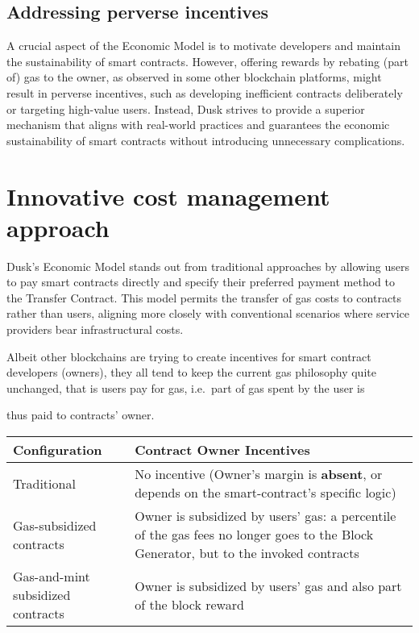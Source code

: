 \documentclass[twocolumn, nofootinbib]{revtex4-2} %
\begin{document}
    \subsection{Addressing perverse incentives}\label{sec:motivations:addressing-perverse-incentives}
    A crucial aspect of the Economic Model is to motivate developers and
    maintain the sustainability of smart contracts.
    However, offering rewards by rebating (part of) gas to the owner, as
    observed in some other blockchain platforms, might result in perverse
    incentives, such as developing inefficient contracts deliberately or
    targeting high-value users.
    Instead, Dusk strives to provide a superior mechanism that aligns with
    real-world practices and guarantees the economic sustainability of smart
    contracts without introducing unnecessary complications.

    \section{Innovative cost management approach}\label{sec:innovative-cost-management-approach}
    Dusk's Economic Model stands out from traditional approaches by allowing
    users to pay smart contracts directly and specify their preferred payment
    method to the Transfer Contract.
    This model permits the transfer of gas costs to contracts rather than users,
    aligning more closely with conventional scenarios where service providers
    bear infrastructural costs.

    Albeit other blockchains are trying to create incentives for smart contract
    developers (owners), they all tend to keep the current gas philosophy quite
    unchanged, that is users pay for gas, i.e.\ part of gas spent by the user is

    thus paid to contracts' owner.

    \begin{tabular}{|m{0.3\linewidth}|m{0.7\linewidth}|}
        \hline
        Configuration & Contract Owner Incentives \\
        \hline
        \hline
        Traditional & No incentive (Owner's margin is \textbf{absent}, or
        depends on the smart-contract's specific logic) \\
        \hline
        Gas-subsidized contracts & Owner is subsidized by users' gas: a
        percentile of the gas fees no longer goes to the Block Generator, but
        to the invoked contracts \\
        \hline
        Gas-and-mint subsidized contracts & Owner is subsidized by users' gas
        and also part of the block reward \\
        \hline
    \end{tabular}
\end{document}
